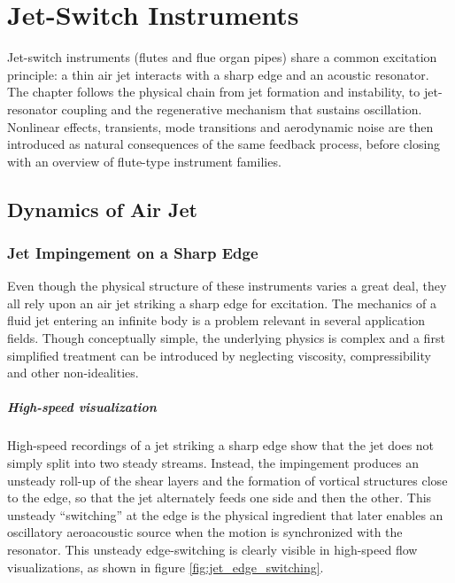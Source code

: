 
\chapter{Jet-Switch Instruments}

Jet-switch instruments (flutes and flue organ pipes) share a common excitation principle: a thin air jet interacts with a sharp edge and an acoustic resonator. The chapter follows the physical chain from jet formation and instability, to jet-resonator coupling and the regenerative mechanism that sustains oscillation. Nonlinear effects, transients, mode transitions and aerodynamic noise are then introduced as natural consequences of the same feedback process, before closing with an overview of flute-type instrument families. 

\section{Dynamics of Air Jet}

\subsection{Jet Impingement on a Sharp Edge}

Even though the physical structure of these instruments varies a great deal, they all rely upon an air jet striking a sharp edge for excitation. The mechanics of a fluid jet entering an infinite body is a problem relevant in several application fields. Though conceptually simple, the underlying physics is complex and a first simplified treatment can be introduced by neglecting viscosity, compressibility and other non-idealities.

\paragraph{High-speed visualization} High-speed recordings of a jet striking a sharp edge show that the jet does not simply split into two steady streams. Instead, the impingement produces an unsteady roll-up of the shear layers and the formation of vortical structures close to the edge, so that the jet alternately feeds one side and then the other. This unsteady ``switching'' at the edge is the physical ingredient that later enables an oscillatory aeroacoustic source when the motion is synchronized with the resonator. This unsteady edge-switching is clearly visible in high-speed flow visualizations, as shown in figure \ref{fig:jet_edge_switching}.

